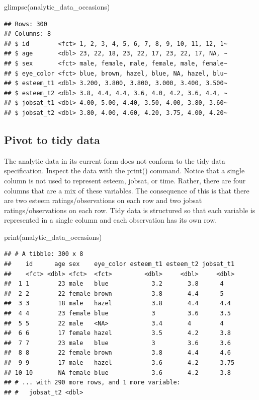 \documentclass[
]{krantz}
\makeatletter
\newenvironment{Shaded}{\begin{snugshade}}{\end{snugshade}}
\newcommand{\FunctionTok}[1]{\textcolor[rgb]{0,0,0}{#1}}
\newcommand{\NormalTok}[1]{#1}
\newenvironment{kframe}{%
\medskip{}
\setlength{\fboxsep}{.8em}
 \def\at@end@of@kframe{}%
 \ifinner\ifhmode%
  \def\at@end@of@kframe{\end{minipage}}%
  \begin{minipage}{\columnwidth}%
 \fi\fi%
 \def\FrameCommand##1{\hskip\@totalleftmargin \hskip-\fboxsep
 \colorbox{shadecolor}{##1}\hskip-\fboxsep
     \hskip-\linewidth \hskip-\@totalleftmargin \hskip\columnwidth}%
 \MakeFramed {\advance\hsize-\width
   \@totalleftmargin\z@ \linewidth\hsize
   \@setminipage}}%
 {\par\unskip\endMakeFramed%
 \at@end@of@kframe}
\renewenvironment{Shaded}{\begin{kframe}}{\end{kframe}}
\makeatother
\begin{document}
\begin{Shaded}
\begin{Highlighting}[]
\FunctionTok{glimpse}\NormalTok{(analytic\_data\_occasions)}
\end{Highlighting}
\end{Shaded}

\begin{verbatim}
## Rows: 300
## Columns: 8
## $ id        <fct> 1, 2, 3, 4, 5, 6, 7, 8, 9, 10, 11, 12, 1~
## $ age       <dbl> 23, 22, 18, 23, 22, 17, 23, 22, 17, NA, ~
## $ sex       <fct> male, female, male, female, male, female~
## $ eye_color <fct> blue, brown, hazel, blue, NA, hazel, blu~
## $ esteem_t1 <dbl> 3.200, 3.800, 3.800, 3.000, 3.400, 3.500~
## $ esteem_t2 <dbl> 3.8, 4.4, 4.4, 3.6, 4.0, 4.2, 3.6, 4.4, ~
## $ jobsat_t1 <dbl> 4.00, 5.00, 4.40, 3.50, 4.00, 3.80, 3.60~
## $ jobsat_t2 <dbl> 3.80, 4.00, 4.60, 4.20, 3.75, 4.00, 4.20~
\end{verbatim}

\hypertarget{pivot-to-tidy-data-2}{%
\subsection{Pivot to tidy data}\label{pivot-to-tidy-data-2}}

The analytic data in its current form does not conform to the tidy data specification. Inspect the data with the print() command.
Notice that a single column is not used to represent esteem, jobsat, or time. Rather, there are four columns that are a mix of these variables. The consequence of this is that there are two esteem ratings/observations on each row and two jobsat ratings/observations on each row. Tidy data is structured so that each variable is represented in a single column and each observation has its own row.

\begin{Shaded}
\begin{Highlighting}[]
\FunctionTok{print}\NormalTok{(analytic\_data\_occasions)}
\end{Highlighting}
\end{Shaded}

\begin{verbatim}
## # A tibble: 300 x 8
##    id      age sex    eye_color esteem_t1 esteem_t2 jobsat_t1
##    <fct> <dbl> <fct>  <fct>         <dbl>     <dbl>     <dbl>
##  1 1        23 male   blue            3.2       3.8      4   
##  2 2        22 female brown           3.8       4.4      5   
##  3 3        18 male   hazel           3.8       4.4      4.4 
##  4 4        23 female blue            3         3.6      3.5 
##  5 5        22 male   <NA>            3.4       4        4   
##  6 6        17 female hazel           3.5       4.2      3.8 
##  7 7        23 male   blue            3         3.6      3.6 
##  8 8        22 female brown           3.8       4.4      4.6 
##  9 9        17 male   hazel           3.6       4.2      3.75
## 10 10       NA female blue            3.6       4.2      3.8 
## # ... with 290 more rows, and 1 more variable:
## #   jobsat_t2 <dbl>
\end{verbatim}
\end{document}
